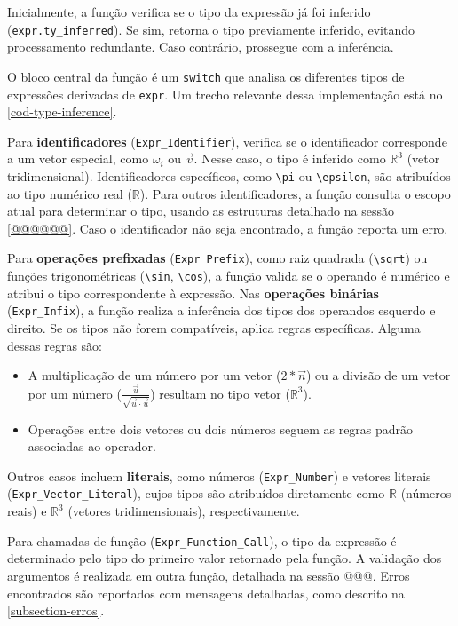 Inicialmente, a função verifica se o tipo da expressão já foi inferido (\verb"expr.ty_inferred"). Se sim, retorna o tipo previamente inferido, evitando processamento redundante. Caso contrário, prossegue com a inferência.

O bloco central da função é um \verb"switch" que analisa os diferentes tipos de expressões derivadas de \verb"expr". Um trecho relevante dessa implementação está no \autoref{cod-type-inference}.

Para \textbf{identificadores} (\verb"Expr_Identifier"), verifica se o identificador corresponde a um vetor especial, como $\omega_i$ ou $\vec{v}$. Nesse caso, o tipo é inferido como $\mathbb{R}^3$ (vetor tridimensional). Identificadores específicos, como \verb"\pi" ou \verb"\epsilon", são atribuídos ao tipo numérico real ($\mathbb{R}$). Para outros identificadores, a função consulta o escopo atual para determinar o tipo, usando as estruturas detalhado na sessão \autoref{@@@@@@}. Caso o identificador não seja encontrado, a função reporta um erro.



Para \textbf{operações prefixadas} (\verb"Expr_Prefix"), como raiz quadrada (\verb"\sqrt") ou funções trigonométricas (\verb"\sin", \verb"\cos"), a função valida se o operando é numérico e atribui o tipo correspondente à expressão. Nas \textbf{operações binárias} (\verb"Expr_Infix"), a função realiza a inferência dos tipos dos operandos esquerdo e direito. Se os tipos não forem compatíveis, aplica regras específicas. Alguma dessas regras são:

\begin{itemize}
    \item A multiplicação de um número por um vetor ($2*\vec{n}$) ou a divisão de um vetor por um número ($\frac{\vec{u}}{\sqrt{\vec{u} \cdot \vec{u}}}$) resultam no tipo vetor ($\mathbb{R}^3$).
    \item Operações entre dois vetores ou dois números seguem as regras padrão associadas ao operador.
\end{itemize}

Outros casos incluem \textbf{literais}, como números (\verb"Expr_Number") e vetores literais (\verb"Expr_Vector_Literal"), cujos tipos são atribuídos diretamente como $\mathbb{R}$ (números reais) e $\mathbb{R}^3$ (vetores tridimensionais), respectivamente.



Para chamadas de função (\verb"Expr_Function_Call"), o tipo da expressão é determinado pelo tipo do primeiro valor retornado pela função. A validação dos argumentos é realizada em outra função, detalhada na sessão @@@. Erros encontrados são reportados com mensagens detalhadas, como descrito na \autoref{subsection-erros}.

